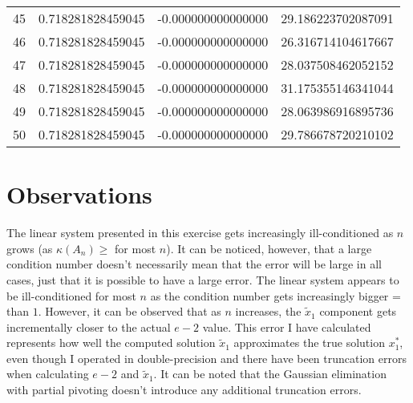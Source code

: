 \documentclass{article}
\begin{document}
\begin{table*}[htb]
\begin{tabular}{c c c c}
45 & 0.718281828459045 & -0.000000000000000 & 29.186223702087091 \\
46 & 0.718281828459045 & -0.000000000000000 & 26.316714104617667 \\
47 & 0.718281828459045 & -0.000000000000000 & 28.037508462052152 \\
48 & 0.718281828459045 & -0.000000000000000 & 31.175355146341044 \\
49 & 0.718281828459045 & -0.000000000000000 & 28.063986916895736 \\
50 & 0.718281828459045 & -0.000000000000000 & 29.786678720210102 \\\hline %
\end{tabular}
\end{table*}

\section{Observations}
The linear system presented in this exercise gets increasingly ill-conditioned as $n$ grows (as $\kappa(A_n)\geq$ for most $n$). It can be noticed, however, that a large condition number doesn’t necessarily mean that the error will be large in all cases, just that it is possible to have a large error. The linear system appears to be ill-conditioned for most $n$ as the condition number gets increasingly bigger = than $1$. However, it can be observed that as $n$ increases, the $\widetilde{x}_1$ component gets incrementally closer to the actual $e-2$ value. This error I have calculated represents how well the computed solution $\widetilde{x}_1$ approximates the true solution $x_1^{\ast}$, even though I operated in double-precision and there have been truncation errors when calculating $e-2$ and $\widetilde{x}_1$. It can be noted that the Gaussian elimination with partial pivoting doesn't introduce any additional truncation errors.
\end{document}
